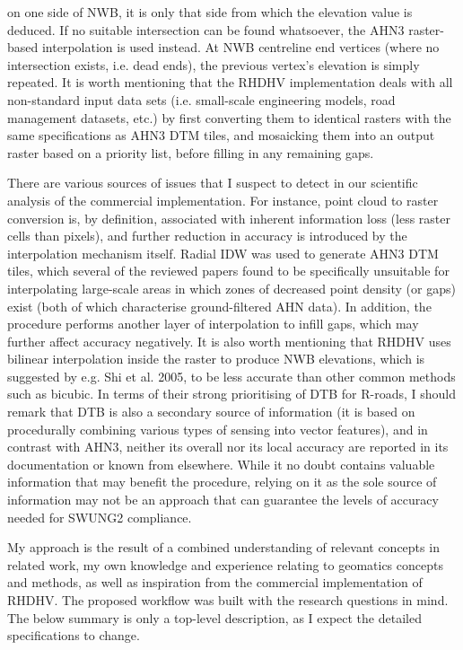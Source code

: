 on one side of NWB, it is only that side from which the elevation value is deduced. If no suitable intersection can be found whatsoever, the AHN3 raster-based interpolation is used instead. At NWB centreline end vertices (where no intersection exists, i.e. dead ends), the previous vertex’s elevation is simply repeated. It is worth mentioning that the RHDHV implementation deals with all non-standard input data sets (i.e. small-scale engineering models, road management datasets, etc.) by first converting them to identical rasters with the same specifications as AHN3 DTM tiles, and mosaicking them into an output raster based on a priority list, before filling in any remaining gaps.

There are various sources of issues  that I suspect to detect in our scientific analysis of the commercial implementation. For instance, point cloud to raster conversion is, by definition, associated with inherent information loss (less raster cells than pixels), and further reduction in accuracy is introduced by the interpolation mechanism itself. Radial IDW was used to generate AHN3 DTM tiles, which several of the reviewed papers found to be specifically unsuitable for interpolating large-scale areas in which zones of decreased point density (or gaps) exist (both of which characterise ground-filtered AHN data). In addition, the procedure performs another layer of interpolation to infill gaps, which may further affect accuracy negatively. It is also worth mentioning that RHDHV uses bilinear interpolation inside the raster to produce NWB elevations, which is suggested by e.g. Shi et al. 2005, to be less accurate than other common methods such as bicubic. In terms of their strong prioritising of DTB for R-roads, I should remark that DTB is also a secondary source of information (it is based on procedurally combining various types of sensing into vector features), and in contrast with AHN3, neither its overall nor its local accuracy are reported in its documentation or known from elsewhere. While it no doubt contains valuable information that may benefit the procedure, relying on it as the sole source of information may not be an approach that can guarantee the levels of accuracy needed for SWUNG2 compliance.

My approach is the result of a combined understanding of relevant concepts in related work, my own knowledge and experience relating to geomatics concepts and methods, as well as inspiration from the commercial implementation of RHDHV. The proposed workflow was built with the research questions in mind. The below summary is only a top-level description, as I expect the detailed specifications to change.

